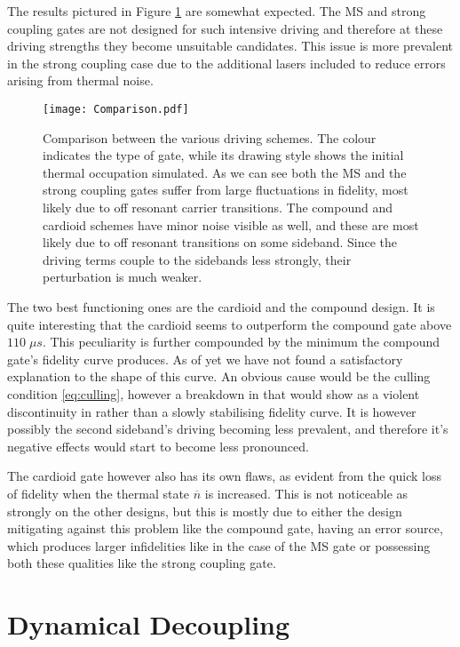 \documentclass[12pt,twoside]{report}
\begin{document}
The results pictured in Figure \ref{fig:comparison} are somewhat expected. The MS and strong coupling gates are not designed for such intensive driving and therefore at these driving strengths they become unsuitable candidates. This issue is more prevalent in the strong coupling case due to the additional lasers included to reduce errors arising from thermal noise.

\begin{figure}[t!]
	\centering
	\texttt{[image: Comparison.pdf]}
	\caption[Gate comparison]{Comparison between the various driving schemes. The colour indicates the type of gate, while its drawing style shows the initial thermal occupation simulated. As we can see both the MS and the strong coupling gates suffer from large fluctuations in fidelity, most likely due to off resonant carrier transitions. The compound and cardioid schemes have minor noise visible as well, and these are most likely due to off resonant transitions on some sideband. Since the driving terms couple to the sidebands less strongly, their perturbation is much weaker.}
	\label{fig:comparison}
\end{figure}

The two best functioning ones are the cardioid and the compound design. It is quite interesting that the cardioid seems to outperform the compound gate above $110\;\mu s$. This peculiarity is further compounded by the minimum the compound gate's fidelity curve produces. As of yet we have not found a satisfactory explanation to the shape of this curve. An obvious cause would be the culling condition \eqref{eq:culling}, however a breakdown in that would show as a violent discontinuity in rather than a slowly stabilising fidelity curve. It is however possibly the second sideband's driving becoming less prevalent, and therefore it's negative effects would start to become less pronounced.

The cardioid gate however also has its own flaws, as evident from the quick loss of fidelity when the thermal state $\overline{n}$ is increased. This is not noticeable as strongly on the other designs, but this is mostly due to either the design mitigating against this problem like the compound gate, having an error source, which produces larger infidelities like in the case of the MS gate or possessing both these qualities like the strong coupling gate.

\section{Dynamical Decoupling}
\label{Driving_schemes:DD}
\end{document}
